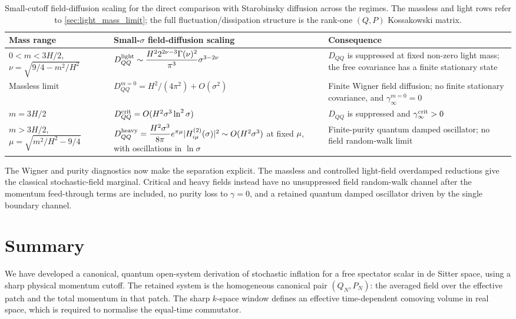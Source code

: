 \documentclass{article}
\numberwithin{equation}{section}
\begin{document}
	\begin{table}[t]
		\centering \small
		\begin{tabularx}{\textwidth}{>{\raggedright\arraybackslash}p{}>{\raggedright\arraybackslash}p{}>{\raggedright\arraybackslash}X}
			\hline Mass range & Small-\(\sigma\) field-diffusion scaling & Consequence \\ \hline \(0<m<3H/2\), \(\nu=\sqrt{9/4-m^2/H^2}\) & \(D_{QQ}^{\rm light}\sim\dfrac{H^2 2^{2\nu-3}\Gamma(\nu)^2}{\pi^3}\sigma^{3-2\nu}\) & \(D_{QQ}\) is suppressed at fixed non-zero light mass; the free covariance has a finite stationary state \\ \hline Massless limit & \(D_{QQ}^{m=0}=H^2/(4\pi^2)+O(\sigma^2)\) & Finite Wigner field diffusion; no finite stationary covariance, and \(\gamma_\infty^{m=0}=0\) \\ \hline \(m=3H/2\) & \(D_{QQ}^{\rm crit}=O(H^2\sigma^3\ln^2\sigma)\) & \(D_{QQ}\) is suppressed and \(\gamma_\infty^{\rm crit}>0\) \\ \hline \(m>3H/2\), \(\mu=\sqrt{m^2/H^2-9/4}\) & \(D_{QQ}^{\rm heavy}=\dfrac{H^2\sigma^3}{8\pi}e^{\pi\mu}|H_{i\mu}^{(2)}(\sigma)|^2\sim O(H^2\sigma^3)\) at fixed \(\mu\), with oscillations in \(\ln\sigma\) & Finite-purity quantum damped oscillator; no field random-walk limit \\ \hline
		\end{tabularx}
		\caption{Small-cutoff field-diffusion scaling for the direct comparison with Starobinsky diffusion across the regimes. The massless and light rows refer to \cref{sec:light_mass_limit}; the full fluctuation/dissipation structure is the rank-one \((Q,P)\) Kossakowski matrix.}
		\label{tab:diffusionScaling}
	\end{table}

	The Wigner and purity diagnostics now make the separation explicit. The massless and controlled light-field overdamped reductions give the classical stochastic-field marginal. Critical and heavy fields instead have no unsuppressed field random-walk channel after the momentum feed-through terms are included, no purity loss to \(\gamma=0\), and a retained quantum damped oscillator driven by the single boundary channel.

	\section{Summary}
	\label{sec:Summary}

	We have developed a canonical, quantum open-system derivation of stochastic inflation for a free spectator scalar in de Sitter space, using a sharp physical momentum cutoff. The retained system is the homogeneous canonical pair \((Q_N,P_N)\): the averaged field over the effective patch and the total momentum in that patch. The sharp \(k\)-space window defines an effective time-dependent comoving volume in real space, which is required to normalise the equal-time commutator.
\end{document}

